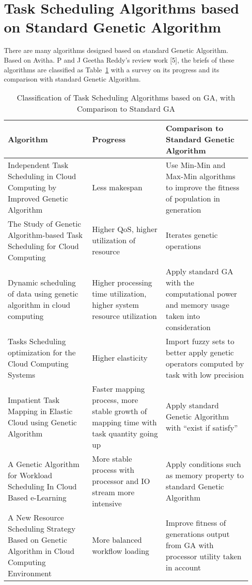 \documentclass[10pt,twoside,openright,logo]{report}
\begin{document}
\section{Task Scheduling Algorithms based on Standard Genetic Algorithm}
There are many algorithms designed based on standard Genetic Algorithm. Based on Avitha. P and J Geetha Reddy’s review work [5], the briefs of these algorithms are classified as Table~\ref{tab:1} with a survey on its progress and its comparison with standard Genetic Algorithm.

\begin{table}[h]
	\caption{Classification of Task Scheduling Algorithms based on GA, with Comparison to Standard GA}\label{tab:1}
\begin{tabularx}{0.9\textwidth}{| X | X | X |}
	\hline			
	Algorithm & Progress & Comparison to Standard Genetic Algorithm \\ \hline
	Independent Task Scheduling in Cloud Computing by Improved Genetic Algorithm \cite{1} & Less makespan & Use Min-Min and Max-Min algorithms to improve the fitness of population in generation \\
	\hline
	The Study of Genetic Algorithm-based Task Scheduling for Cloud Computing \cite{6} & Higher QoS, higher utilization of resource & Iterates genetic operations \\ \hline
	Dynamic scheduling of data using genetic algorithm in cloud computing \cite{7} & Higher processing time utilization, higher system resource utilization & Apply standard GA with the computational power and memory usage taken into consideration \\ \hline
	Tasks Scheduling optimization for the Cloud Computing Systems \cite{8} & Higher elasticity & Import fuzzy sets to better apply genetic operators computed by task with low precision \\ \hline
	Impatient Task Mapping in Elastic Cloud using Genetic Algorithm \cite{2} & Faster mapping process, more stable growth of mapping time with task quantity going up & Apply standard Genetic Algorithm with “exist if satisfy” \\ \hline
	A Genetic Algorithm for Workload Scheduling In Cloud Based e-Learning \cite{9} & More stable process with processor and IO stream more intensive & Apply conditions such as memory property to standard Genetic Algorithm \\ \hline
	A New Resource Scheduling Strategy Based on Genetic Algorithm in Cloud Computing Environment \cite{10} & More balanced workflow loading & Improve fitness of generations output from GA with processor utility taken in account \\ \hline

\end{tabularx}
\end{table}
\end{document}
